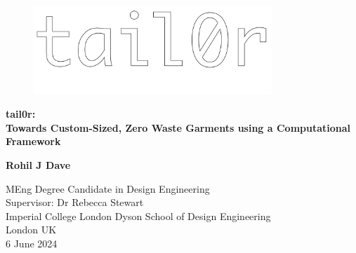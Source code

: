 \begin{titlepage}
    \begin{center}
        \vspace*{1cm}
        \begin{figure} [H]
            \centering
            \includegraphics[width=0.8\textwidth]{Images/tail0r wordmark.png}
        \end{figure}
        
        \Huge
        \textbf{tail0r: \\ Towards Custom-Sized, Zero Waste Garments using a Computational Framework}

 
        \vspace{1.5cm}
 
 
        \vfill
        
        
        \textbf{Rohil J Dave}
 
        \vspace{0.8cm}
 

 
        \Large
        MEng Degree Candidate in Design Engineering\\
        Supervisor: Dr Rebecca Stewart\\
        Imperial College London Dyson School of Design Engineering\\
        London UK\\
        6 June 2024
 
    \end{center}
\end{titlepage}